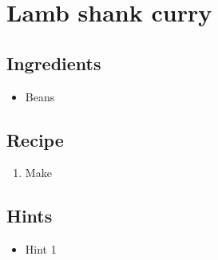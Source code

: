 \section{Lamb shank curry}
\subsection*{Ingredients}
\begin{itemize}
    \item Beans
\end{itemize}

\subsection*{Recipe}
\begin{enumerate}
    \item Make
\end{enumerate}

\subsection*{Hints}
\begin{itemize}
    \item Hint 1
\end{itemize}
\newpage